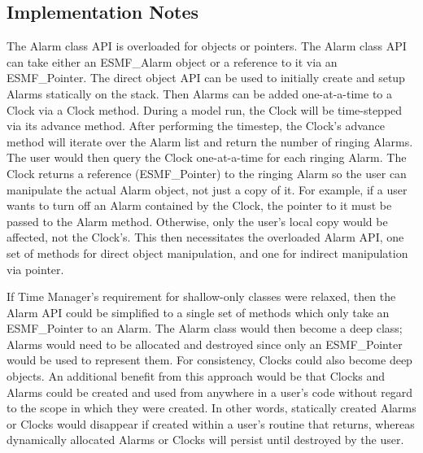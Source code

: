 
\subsection{Implementation Notes}

The Alarm class API is overloaded for objects or pointers.  The Alarm
class API can take either an ESMF\_Alarm object or a reference to it via an
ESMF\_Pointer.  The direct object API can be used to initially create and setup
Alarms statically on the stack.  Then Alarms can be added one-at-a-time to a
Clock via a Clock method.  During a model run, the Clock will be time-stepped
via its advance method.  After performing the timestep, the Clock's advance
method will iterate over the Alarm list and return the number of ringing Alarms.
The user would then query the Clock one-at-a-time for each ringing Alarm.  The
Clock returns a reference (ESMF\_Pointer) to the ringing Alarm so the user can
manipulate the actual Alarm object, not just a copy of it.  For example, if a
user wants to turn off an Alarm contained by the Clock, the pointer to it must
be passed to the Alarm method.  Otherwise, only the user's local copy would be
affected, not the Clock's.  This then necessitates the overloaded Alarm API,
one set of methods for direct object manipulation, and one for indirect
manipulation via pointer.

If Time Manager's requirement for shallow-only classes were relaxed, then the
Alarm API could be simplified to a single set of methods which only take an
ESMF\_Pointer to an Alarm.  The Alarm class would then become a deep class;
Alarms would need to be allocated and destroyed since only an ESMF\_Pointer
would be used to represent them.  For consistency, Clocks could also become
deep objects.  An additional benefit from this approach would be that Clocks
and Alarms could be created and used from anywhere in a user's code without
regard to the scope in which they were created.  In other words, statically
created Alarms or Clocks would disappear if created within a user's routine
that returns, whereas dynamically allocated Alarms or Clocks will persist
until destroyed by the user.
